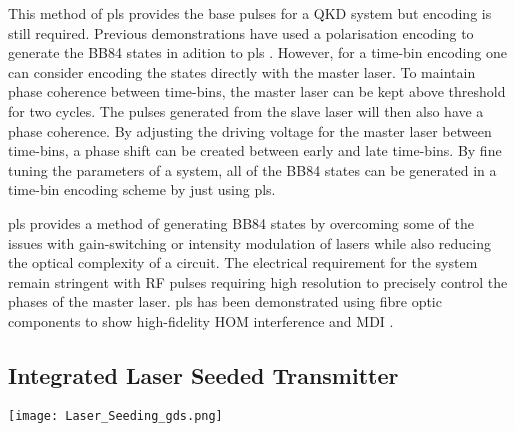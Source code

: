 This method of \ac{pls} provides the base pulses for a \ac{QKD} system but encoding is still required. Previous demonstrations have used a polarisation encoding to generate the BB84 states in adition to \ac{pls} \cite{Comandar2016}. However, for a time-bin encoding one can consider encoding the states directly with the master laser. To maintain phase coherence between time-bins, the master laser can be kept above threshold for two cycles. The pulses generated from the slave laser will then also have a phase coherence. By adjusting the driving voltage for the master laser between time-bins, a phase shift can be created between early and late time-bins. By fine tuning the parameters of a system, all of the BB84 states can be generated in a time-bin encoding scheme by just using \ac{pls}.

\Ac{pls} provides a method of generating BB84 states by overcoming some of the issues with gain-switching or intensity modulation of lasers while also reducing the optical complexity of a circuit. The electrical requirement for the system remain stringent with RF pulses requiring high resolution to precisely control the phases of the master laser. \Ac{pls} has been demonstrated using fibre optic components to show high-fidelity \ac{HOM} interference and \ac{MDI} \cite{Comandar2016PLS, Comandar2016}. 


\subsection{Integrated Laser Seeded Transmitter}

\begin{sidewaysfigure}
	\centering
	\texttt{[image: Laser\_Seeding\_gds.png]}
	\caption[InP laser seeding transmitter with QRNG]{This shows the layout of the laser seeded transmitter device fabricated by HHI. The optical components are shown in blue while the electrical connections are in red. The chip measures \SI{6x4}{mm} and contains two laser seeding prototype circuits, a homodyne \ac{qrng} and test structure to measure laser and waveguide performances. Wires are routed to the side of the chip to allow wirebonding. Light is converted from the waveguide mode to a \SI{10}{\um} mode with \acp{ssc} at the side of the chip.}
	\label{fig:hhi_laser_seeding}
\end{sidewaysfigure}

